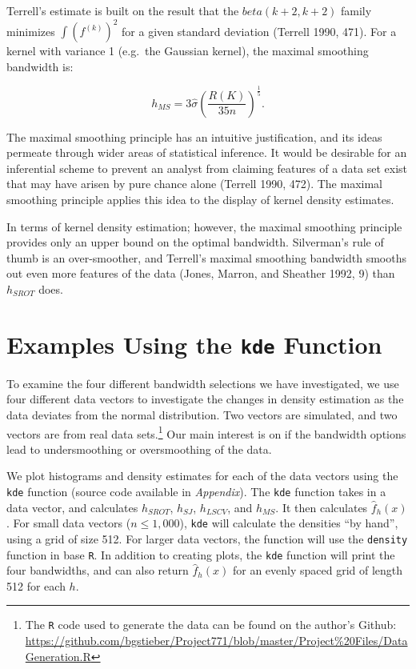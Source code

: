 \documentclass[]{article}
\let\rmarkdownfootnote\footnote%
\def\footnote{\protect\rmarkdownfootnote}
\begin{document}
Terrell's estimate is built on the result that the
\(beta(k + 2, k + 2)\) family minimizes \(\int (f^{(k)})^2\) for a given
standard deviation (Terrell 1990, 471). For a kernel with variance 1
(e.g.~the Gaussian kernel), the maximal smoothing bandwidth is:

\[
h_{MS} =  3 \hat \sigma \left(\frac{R(K)}{35 n} \right)^{\frac{1}{5}}.
\]

The maximal smoothing principle has an intuitive justification, and its
ideas permeate through wider areas of statistical inference. It would be
desirable for an inferential scheme to prevent an analyst from claiming
features of a data set exist that may have arisen by pure chance alone
(Terrell 1990, 472). The maximal smoothing principle applies this idea
to the display of kernel density estimates.

In terms of kernel density estimation; however, the maximal smoothing
principle provides only an upper bound on the optimal bandwidth.
Silverman's rule of thumb is an over-smoother, and Terrell's maximal
smoothing bandwidth smooths out even more features of the data (Jones,
Marron, and Sheather 1992, 9) than \(h_{SROT}\) does.

\section{\texorpdfstring{Examples Using the \texttt{kde}
Function}{Examples Using the kde Function}}\label{examples-using-the-kde-function}

To examine the four different bandwidth selections we have investigated,
we use four different data vectors to investigate the changes in density
estimation as the data deviates from the normal distribution. Two
vectors are simulated, and two vectors are from real data
sets.\footnote{The \texttt{R} code used to generate the data can be
  found on the author's Github:
  \url{https://github.com/bgstieber/Project771/blob/master/Project\%20Files/DataGeneration.R}}
Our main interest is on if the bandwidth options lead to undersmoothing
or oversmoothing of the data.

We plot histograms and density estimates for each of the data vectors
using the \texttt{kde} function (source code available in
\emph{Appendix}). The \texttt{kde} function takes in a data vector, and
calculates \(h_{SROT}\), \(h_{SJ}\), \(h_{LSCV}\), and \(h_{MS}\). It
then calculates \(\widehat{f}_h(x)\). For small data vectors
(\(n \leq 1,000\)), \texttt{kde} will calculate the densities ``by
hand'', using a grid of size 512. For larger data vectors, the function
will use the \texttt{density} function in base \texttt{R}. In addition
to creating plots, the \texttt{kde} function will print the four
bandwidths, and can also return \(\widehat{f}_h(x)\) for an evenly
spaced grid of length 512 for each \(h\).
\end{document}
